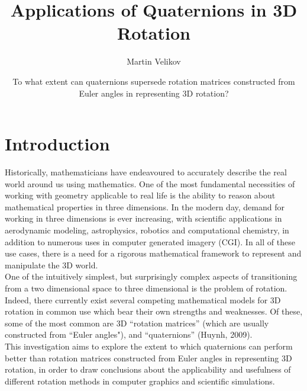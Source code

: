 \documentclass[12pt, a4paper]{article}
\title{\vspace{-2cm}Applications of Quaternions in 3D Rotation}
\author{Martin Velikov}
\date{To what extent can quaternions supersede rotation matrices constructed from Euler
    angles in representing 3D rotation?}
\begin{document}
\maketitle
\tableofcontents

\pagebreak

\section{Introduction}
Historically, mathematicians have endeavoured to accurately describe the real
world around us using mathematics. One of the most fundamental necessities of
working with geometry applicable to real life is the ability to reason about
mathematical properties in three dimensions. In the modern day, demand for
working in three dimensions is ever increasing, with scientific applications in
aerodynamic modeling, astrophysics, robotics and computational chemistry, in
addition to numerous uses in computer generated imagery (CGI). In all of these
use cases, there is a need for a rigorous mathematical framework to represent
and manipulate the 3D world. \\

One of the intuitively simplest, but surprisingly complex aspects of
transitioning from a two dimensional space to three dimensional is the problem
of rotation. Indeed, there currently exist several competing mathematical models
for 3D rotation in common use which bear their own strengths and weaknesses. Of
these, some of the most common are 3D ``rotation matrices'' (which are usually
constructed from ``Euler angles"), and ``quaternions'' (Huynh, 2009).\\


This investigation aims to explore the extent to which quaternions can perform
better than rotation matrices constructed from Euler angles in representing 3D
rotation, in order to draw conclusions about the applicability and usefulness of
different rotation methods in computer graphics and scientific simulations. \\
\end{document}

